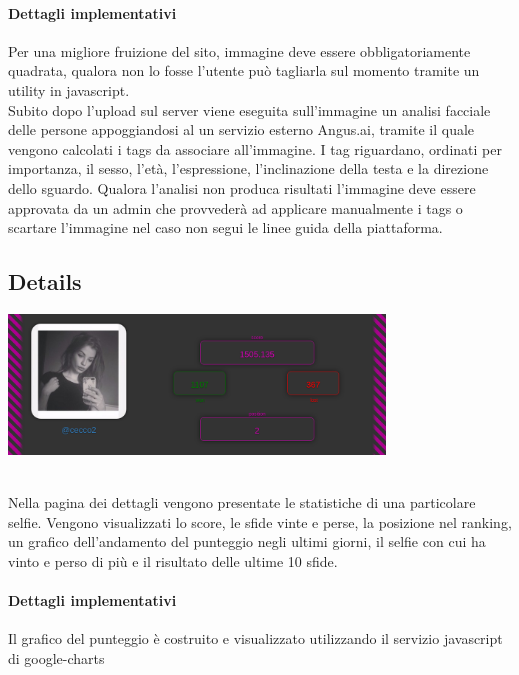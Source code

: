 \documentclass{article}
\begin{document}
\paragraph{Dettagli implementativi}
Per una migliore fruizione del sito, immagine deve essere obbligatoriamente quadrata, qualora non lo fosse l'utente può tagliarla sul momento tramite un utility in javascript.\\
Subito dopo l'upload sul server viene eseguita sull'immagine un analisi facciale delle persone appoggiandosi al un servizio esterno Angus.ai, tramite il quale vengono calcolati i tags da associare all'immagine.
I tag riguardano, ordinati per importanza, il sesso, l'età, l'espressione, l'inclinazione della testa e la direzione dello sguardo.
Qualora l'analisi non produca risultati l'immagine deve essere approvata da un admin che provvederà ad applicare manualmente i tags o scartare l'immagine nel caso non segui le linee guida della piattaforma.

\subsection{Details}
\begin{center}\includegraphics[width=0.75\textwidth]{res/details.png}\end{center}\\
Nella pagina dei dettagli vengono presentate le statistiche di una particolare selfie. Vengono visualizzati lo score, le sfide vinte e perse, la posizione nel ranking, un grafico dell'andamento del punteggio negli ultimi giorni, il selfie con cui ha vinto e perso di più e il risultato delle ultime 10 sfide.

\paragraph{Dettagli implementativi}
Il grafico del punteggio è costruito e visualizzato utilizzando il servizio javascript di google-charts
\end{document}
